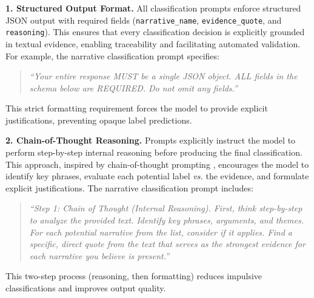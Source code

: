 \noindent\textbf{1. Structured Output Format.} 
All classification prompts enforce structured JSON output with required fields (\texttt{narrative\_name}, \texttt{evidence\_quote}, and \texttt{reasoning}). 
This ensures that every classification decision is explicitly grounded in textual evidence, enabling traceability and facilitating automated validation. For example, the narrative classification prompt specifies:

\begin{quote}
\small
\textit{``Your entire response MUST be a single JSON object. ALL fields in the schema below are REQUIRED. Do not omit any fields.''}
\end{quote}

\noindent This strict formatting requirement forces the model to provide explicit justifications, preventing opaque label predictions.

\noindent\textbf{2. Chain-of-Thought Reasoning.} 
Prompts explicitly instruct the model to perform step-by-step internal reasoning before producing the final classification. 
This approach, inspired by chain-of-thought prompting \citep{wei2022chain}, encourages the model to identify key phrases, evaluate each potential label \textit{vs.} the evidence, and formulate explicit justifications. 
The narrative classification prompt includes:

\begin{quote}
\small
\textit{``Step 1: Chain of Thought (Internal Reasoning). First, think step-by-step to analyze the provided text. Identify key phrases, arguments, and themes. For each potential narrative from the list, consider if it applies. Find a specific, direct quote from the text that serves as the strongest evidence for each narrative you believe is present.''}
\end{quote}

\noindent This two-step process (reasoning, then formatting) reduces impulsive classifications and improves output quality.

